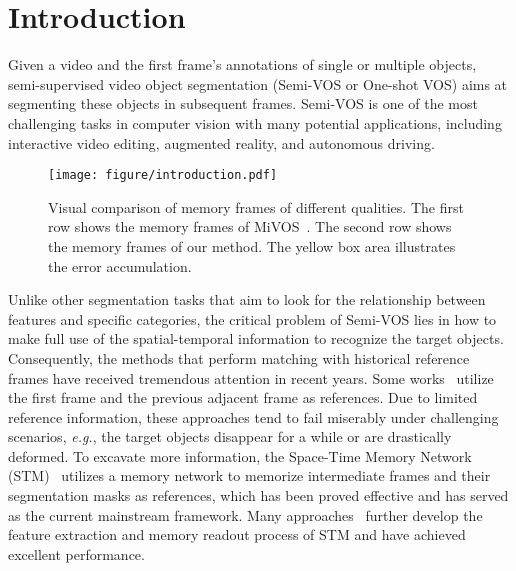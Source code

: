 \documentclass[runningheads]{llncs}
\begin{document}
\section{Introduction}

Given a video and the first frame's annotations of single or multiple objects, semi-supervised video object segmentation (Semi-VOS or One-shot VOS) aims at segmenting these objects in subsequent frames. Semi-VOS is one of the most challenging tasks in computer vision with many potential applications, including interactive video editing, augmented reality, and autonomous driving. 

\begin{figure}[t]
  \centering
  \texttt{[image: figure/introduction.pdf]}
  \caption{Visual comparison of memory frames of different qualities. 
The first row shows the memory frames of MiVOS~\cite{mivos}. The second row shows the memory frames of our method. The yellow box area illustrates the error accumulation.}
  \label{bank}
\end{figure} Unlike other segmentation tasks that aim to look for the relationship between features and specific categories, the critical problem of Semi-VOS lies in how to make full use of the spatial-temporal information to recognize the target objects. 
Consequently, the methods that perform matching with historical reference frames have received tremendous attention in recent years.
Some works~\cite{feelvos,cfbi,cfbi+} utilize the first frame and the previous adjacent frame as references.
Due to limited reference information, these approaches tend to fail miserably under challenging scenarios, \textit{e.g.}, the target objects disappear for a while or are drastically deformed.
To excavate more information, the Space-Time Memory Network (STM)~\cite{stm} utilizes a memory network to memorize intermediate frames and their segmentation masks as references, which has been proved effective and has served as the current mainstream framework.
Many approaches~\cite{kmn,gcm,mivos,lcm,rmnet,hmm,swiftnet,stcn} further develop the feature extraction and memory readout process of STM and have achieved excellent performance.
\end{document}
